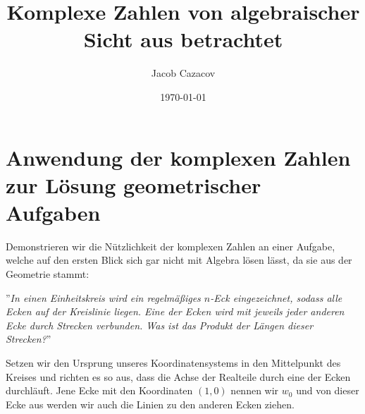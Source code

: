 \documentclass[a4paper,12pt]{article} %
\author{Jacob Cazacov}
\title{Komplexe Zahlen von algebraischer Sicht aus betrachtet}
\date{\today}
\begin{document}

\section{Anwendung der komplexen Zahlen zur Lösung geometrischer Aufgaben}

Demonstrieren wir die Nützlichkeit der komplexen Zahlen an einer Aufgabe, welche auf den ersten Blick sich gar nicht mit Algebra lösen lässt, da sie aus der Geometrie stammt:

''\textit{In einen Einheitskreis wird ein regelmäßiges $n$-Eck eingezeichnet, sodass alle Ecken auf der Kreislinie liegen.
Eine der Ecken wird mit jeweils jeder anderen Ecke durch Strecken verbunden.
Was ist das Produkt der Längen dieser Strecken?}''



Setzen wir den Ursprung unseres Koordinatensystems in den Mittelpunkt des Kreises und richten es so aus, dass die Achse der Realteile durch eine der Ecken durchläuft.
Jene Ecke mit den Koordinaten $(1,0)$ nennen wir $w_0$ und von dieser Ecke aus werden wir auch die Linien zu den anderen Ecken ziehen.
\end{document}
